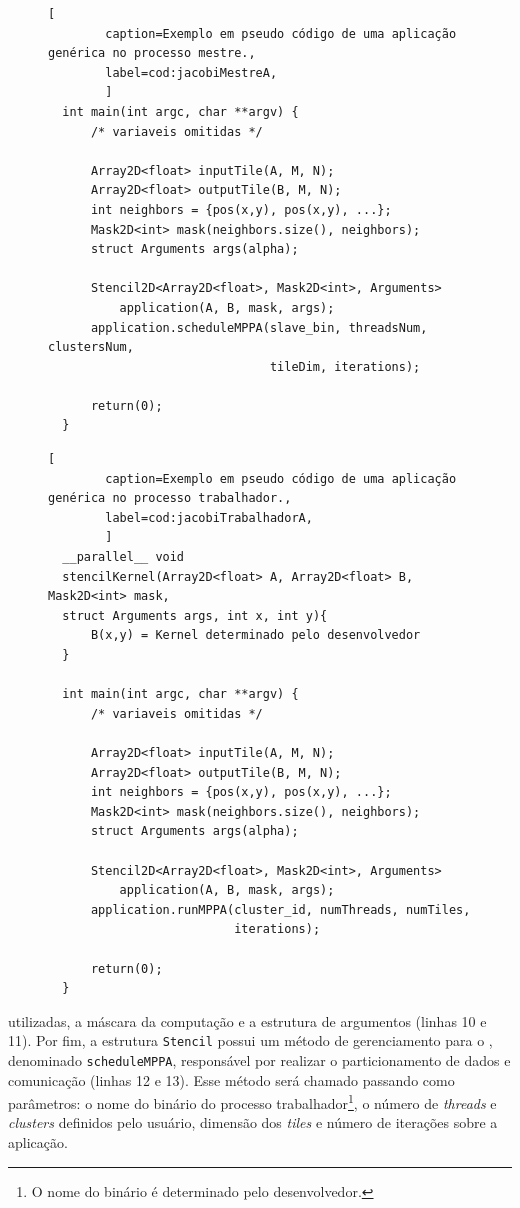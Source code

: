 \begin{figure}[!h]
    \begin{lstlisting}[
        caption=Exemplo em pseudo código de uma aplicação genérica no processo mestre.,
        label=cod:jacobiMestreA,
        ]
  int main(int argc, char **argv) {
      /* variaveis omitidas */

      Array2D<float> inputTile(A, M, N);
      Array2D<float> outputTile(B, M, N);
      int neighbors = {pos(x,y), pos(x,y), ...};
      Mask2D<int> mask(neighbors.size(), neighbors);
      struct Arguments args(alpha);

      Stencil2D<Array2D<float>, Mask2D<int>, Arguments>
          application(A, B, mask, args);
      application.scheduleMPPA(slave_bin, threadsNum, clustersNum,
                               tileDim, iterations);

      return(0);
  }
    \end{lstlisting}
\end{figure}
\begin{figure}[!h]
    \begin{lstlisting}[
        caption=Exemplo em pseudo código de uma aplicação genérica no processo trabalhador.,
        label=cod:jacobiTrabalhadorA,
        ]
  __parallel__ void
  stencilKernel(Array2D<float> A, Array2D<float> B, Mask2D<int> mask,
  struct Arguments args, int x, int y){
      B(x,y) = Kernel determinado pelo desenvolvedor
  }

  int main(int argc, char **argv) {
      /* variaveis omitidas */

      Array2D<float> inputTile(A, M, N);
      Array2D<float> outputTile(B, M, N);
      int neighbors = {pos(x,y), pos(x,y), ...};
      Mask2D<int> mask(neighbors.size(), neighbors);
      struct Arguments args(alpha);

      Stencil2D<Array2D<float>, Mask2D<int>, Arguments>
          application(A, B, mask, args);
      application.runMPPA(cluster_id, numThreads, numTiles,
                          iterations);

      return(0);
  }
    \end{lstlisting}
\end{figure}

utilizadas, a máscara da computação e a estrutura de argumentos (linhas 10 e 11). Por fim, a
estrutura \texttt{Stencil} possui um método de gerenciamento para o \mppa,
denominado \texttt{scheduleMPPA}, responsável por realizar o particionamento de
dados e comunicação (linhas 12 e 13). Esse método será chamado passando como parâmetros: o nome
do binário do processo trabalhador\footnote{O nome do binário é determinado pelo desenvolvedor.}, o
número de \textit{threads} e \textit{clusters} definidos pelo usuário, dimensão
dos \textit{tiles} e número de iterações sobre a aplicação.


